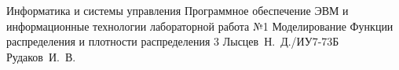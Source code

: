 \documentclass{bmstu}
\begin{document}
\makereporttitle
{Информатика и системы управления} %
{Программное обеспечение ЭВМ и информационные технологии}
{лабораторной работа №1} %
{Моделирование} %
{Функции распределения и плотности распределения} %
{3} %
{Лысцев~Н.~Д./ИУ7-73Б} %
{Рудаков~И.~В.} %
{}

\maketableofcontents

%


%
%
%

\end{document}
